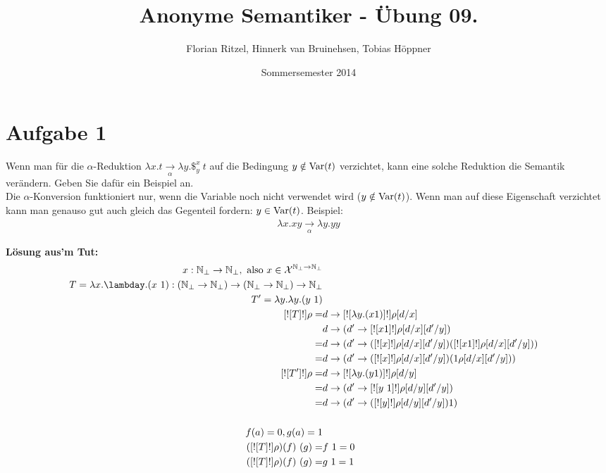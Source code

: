 \documentclass[ngerman,a4paper]{report}
\author{Florian Ritzel, Hinnerk van Bruinehsen, Tobias Höppner}
\title{Anonyme Semantiker - Übung 09. }
\date{Sommersemester 2014}
\renewcommand{\maketitle}{}
\begin{document}
\maketitle
\section*{Aufgabe 1}
Wenn man für die $\alpha$-Reduktion $\lambda x.t \xrightarrow[\alpha]{} \lambda y.\$_y^x\ t$ auf die Bedingung $y \notin \text{\lstinline!Var!}(t)$ verzichtet, kann eine solche Reduktion die Semantik verändern. Geben Sie dafür ein Beispiel an.\\

Die $\alpha$-Konversion funktioniert nur, wenn die Variable noch nicht verwendet wird ($y \notin \text{\lstinline!Var!}(t)$). Wenn man auf diese Eigenschaft verzichtet kann man genauso gut auch gleich das Gegenteil fordern: $y \in \text{\lstinline!Var!}(t)$. Beispiel:
\begin{align*}
\lambda x.xy \xrightarrow[\alpha]{}\lambda y.yy
\end{align*}

\textbf{Lösung aus'm Tut:}
\begin{align*}
x : \mathbb{N}_\perp \rightarrow \mathbb{N}_\perp, \text{ also } x \in \mathcal{X}^{\mathbb{N}_\perp \rightarrow \mathbb{N}_\perp}\\
T = \lambda x.\lambday.(x\ 1) : (\mathbb{N}_\perp \rightarrow \mathbb{N}_\perp) \rightarrow (\mathbb{N}_\perp \rightarrow \mathbb{N}_\perp) \rightarrow \mathbb{N}_\perp\\
T' = \lambda y . \lambda y . (y \ 1)\\
[![ T ]!] \rho = &d \rightarrow [![ \lambda y . (x 1) ]!] \rho [d/x]\\
&d \rightarrow (d' \rightarrow [![ x 1 ]!] \rho [d/x][d'/y])\\
=&d \rightarrow (d' \rightarrow ([![ x ]!] \rho [d/x][d'/y])( [![ x 1 ]!] \rho [d/x][d'/y]))\\
=&d \rightarrow (d' \rightarrow ([![ x ]!] \rho [d/x][d'/y])( 1 \rho [d/x][d'/y]))\\
[![ T' ]!] \rho = & d \rightarrow [![ \lambda y . (y 1) ]!] \rho [d/y]\\
= & d \rightarrow (d' \rightarrow [![ y \ 1 ]!] \rho [d/y][d'/y])\\
= & d \rightarrow (d' \rightarrow ([![ y ]!] \rho [d/y] [d'/y]) 1 )\\
\\
f(a) = 0, g(a) = 1\\
([![ T ]!] \rho) (f)\ (g) = & f\ 1 = 0\\
([![ T ]!] \rho) (f)\ (g) = & g\ 1 = 1\\
\end{align*}
\end{document}
